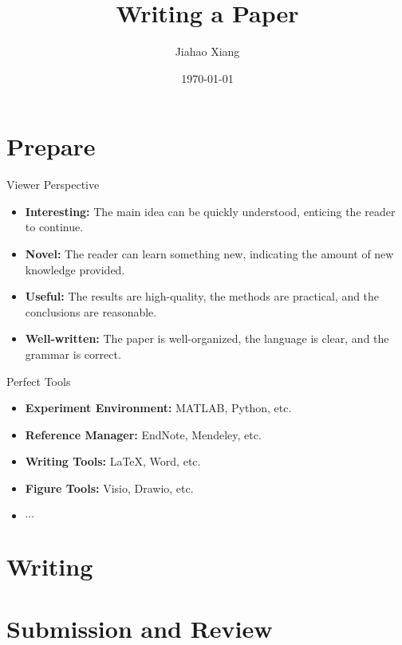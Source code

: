 \documentclass{beamer}
\title{Writing a Paper}
\author[xjh]{Jiahao Xiang\inst{1}}
\institute{
    \inst{1}
    Hengyang Normal University
}
\date{\today}
\begin{document}
\begin{frame}
    \titlepage
\end{frame}


\section{Prepare}
\begin{frame}{Viewer Perspective}
    \begin{itemize}
        \item \textbf{Interesting:} The main idea can be quickly understood, enticing the reader to continue.
        \item \textbf{Novel:} The reader can learn something new, indicating the amount of new knowledge provided.
        \item \textbf{Useful:} The results are high-quality, the methods are practical, and the conclusions are reasonable.
        \item \textbf{Well-written:} The paper is well-organized, the language is clear, and the grammar is correct.
    \end{itemize}
\end{frame}

\begin{frame}{Perfect Tools} %
    \begin{itemize} %
        \item \textbf{Experiment Environment:} MATLAB, Python, etc. %
        \item \textbf{Reference Manager:} EndNote, Mendeley, etc. %
        \item \textbf{Writing Tools:} \LaTeX, Word, etc. %
        \item \textbf{Figure Tools:} Visio, Drawio, etc. %
        \item $\cdots$ %
    \end{itemize} %
\end{frame} %

\section{Writing}

\section{Submission and Review}
\end{document}
